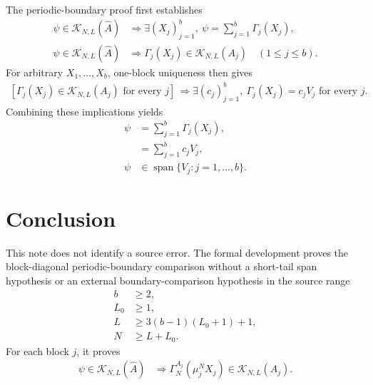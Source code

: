\documentclass{article}
\begin{document}
The periodic-boundary proof first establishes
\begin{align}
  \psi\in\mathcal K_{N,L}(\widehat A)
    &\Longrightarrow
    \exists(X_j)_{j=1}^b,\
    \psi=\sum_{j=1}^b\Gamma_j(X_j),
  \label{eq:cpgsv21_block_diagonal_parent_ground_space_first_implication_decompose}\\
  \psi\in\mathcal K_{N,L}(\widehat A)
    &\Longrightarrow
    \Gamma_j(X_j)\in\mathcal K_{N,L}(A_j)
    \quad (1\leq j\leq b).
  \label{eq:cpgsv21_block_diagonal_parent_ground_space_first_implication_components}
\end{align}
For arbitrary $X_1,\ldots,X_b$, one-block uniqueness then gives
\begin{align}
  \left[\Gamma_j(X_j)\in\mathcal K_{N,L}(A_j)
    \text{ for every }j\right]
    &\Longrightarrow
    \exists(c_j)_{j=1}^b,\
    \Gamma_j(X_j)=c_jV_j
    \text{ for every }j.
  \label{eq:cpgsv21_block_diagonal_parent_ground_space_second_implication}
\end{align}
Combining these implications yields
\begin{align}
  \psi
    &=
    \sum_{j=1}^b\Gamma_j(X_j),
  \label{eq:cpgsv21_block_diagonal_parent_ground_space_span_composition_first}\\
  &=
    \sum_{j=1}^bc_jV_j,
  \label{eq:cpgsv21_block_diagonal_parent_ground_space_span_composition_second}\\
  \psi
    &\in
    \operatorname{span}\{V_j:j=1,\ldots,b\}.
  \label{eq:cpgsv21_block_diagonal_parent_ground_space_span_conclusion}
\end{align}

\section{Conclusion}

This note does not identify a source error. The formal development proves the
block-diagonal periodic-boundary comparison without a short-tail span
hypothesis or an external boundary-comparison hypothesis in the source range
\begin{align}
  b
    &\geq
    2,
  \label{eq:cpgsv21_block_diagonal_parent_ground_space_conclusion_blocks}\\
  L_0
    &\geq
    1,
  \label{eq:cpgsv21_block_diagonal_parent_ground_space_conclusion_injectivity}\\
  L
    &\geq
    3(b-1)(L_0+1)+1,
  \label{eq:cpgsv21_block_diagonal_parent_ground_space_conclusion_local_length}\\
  N
    &\geq
    L+L_0.
  \label{eq:cpgsv21_block_diagonal_parent_ground_space_conclusion_global_length}
\end{align}
For each block $j$, it proves
\begin{align}
  \psi\in\mathcal K_{N,L}(\widehat A)
    &\Longrightarrow
    \Gamma_N^{A_j}(\mu_j^NX_j)
    \in
    \mathcal K_{N,L}(A_j).
  \label{eq:cpgsv21_block_diagonal_parent_ground_space_conclusion_component}
\end{align}
\end{document}
